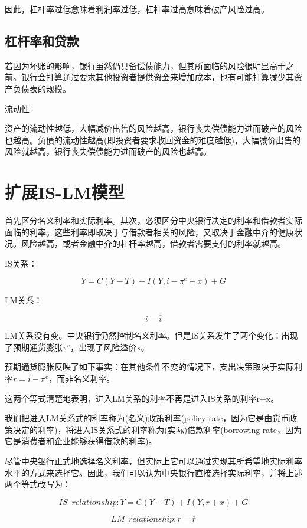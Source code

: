 \documentclass{article}
\begin{document}
因此，杠杆率过低意味着利润率过低，杠杆率过高意味着破产风险过高。

\subsection{杠杆率和贷款}

若因为坏账的影响，银行虽然仍具备偿债能力，但其所面临的风险很明显高于之前。银行会打算通过要求其他投资者提供资金来增加成本，也有可能打算减少其资产负债表的规模。

\hspace*{\fill}

流动性

资产的流动性越低，大幅减价出售的风险越高，银行丧失偿债能力进而破产的风险也越高。负债的流动性越高(即投资者要求收回资金的难度越低)，大幅减价出售的风险就越高，银行丧失偿债能力进而破产的风险也越高。

\section{扩展IS-LM模型}

首先区分名义利率和实际利率。其次，必须区分中央银行决定的利率和借款者实际面临的利率。这些利率即取决于与借款者相关的风险，又取决于金融中介的健康状况。风险越高，或者金融中介的杠杆率越高，借款者需要支付的利率就越高。

IS关系：

\[
Y=C(Y-T)+I(Y,i-\pi^e+x)+G
\]

LM关系：

\[
i=\overline{i}
\]

LM关系没有变。中央银行仍然控制名义利率。但是IS关系发生了两个变化：出现了预期通货膨胀$ \pi^e $，出现了风险溢价x。

预期通货膨胀反映了如下事实：在其他条件不变的情况下，支出决策取决于实际利率$ r=i-\pi^e $，而非名义利率。

这两个等式清楚地表明，进入LM关系的利率不再是进入IS关系的利率r+x。

我们把进入LM关系式的利率称为(名义)政策利率(policy rate，因为它是由货币政策决定的利率)，将进入IS关系式的利率称为(实际)借款利率(borrowing rate，因为它是消费者和企业能够获得借款的利率)。

尽管中央银行正式地选择名义利率，但实际上它可以通过实现其所希望地实际利率水平的方式来选择它。因此，我们可以认为中央银行直接选择实际利率，并将上述两个等式改写为：

\[
IS\enspace relationship: Y=C(Y-T)+I(Y,r+x)+G
\]

\[
LM\enspace relationship: r=\overline{r}
\]
\end{document}
